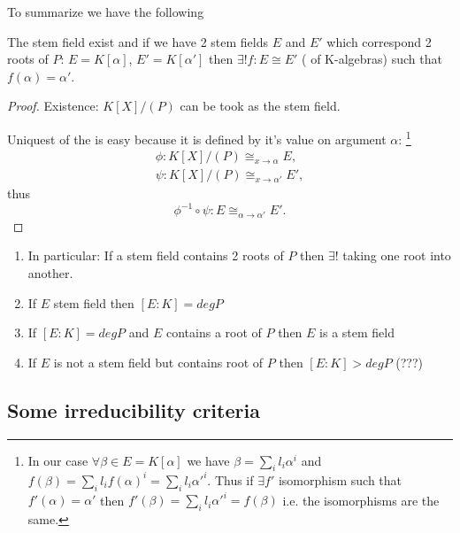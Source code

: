 To summarize we have the following
\begin{proposition}
  The stem field exist and if we have 2 stem fields $E$ and $E'$ which
  correspond 2 roots of $P$: $E = K\left[\alpha\right]$,
  $E' = K\left[\alpha'\right]$ then $\exists! f: E \cong E'$
  ( of K-algebras) such that $f(\alpha) =
  \alpha'$. 
  \begin{proof}
    Existence: $K\left[X\right]/\left(P\right)$ can be took as the
    stem field.

    Uniquest of the  is easy because it is
    defined by it's value on argument $\alpha$:
    \footnote{
      In our case $\forall \beta \in E = K\left[\alpha\right]$ we have
      $\beta = \sum_i l_i \alpha^i$ and
      $f\left( \beta \right) = \sum_i l_i f \left( \alpha\right)^i =
      \sum_i l_i \alpha'^i$.
      Thus if $\exists f'$ isomorphism such that $f'\left(\alpha \right) =
      \alpha'$ then
      $f'\left( \beta \right) = \sum_i l_i \alpha'^i = f \left( \beta
      \right)$ i.e. the isomorphisms are the same.
    }
    \begin{eqnarray}
      \phi: K\left[X\right]/\left(P\right) \cong_{x \to \alpha} E,
      \nonumber \\
      \psi: K\left[X\right]/\left(P\right) \cong_{x \to \alpha'} E',
      \nonumber
    \end{eqnarray}
    thus
    \[
    \phi^{-1} \circ \psi: E \cong_{\alpha \to \alpha'} E'.
    \]
  \end{proof}
  \label{prop:stemfield}
\end{proposition}

\begin{remark}
  \begin{enumerate}
  \item In particular: If a stem field contains 2 roots of $P$ then
    $\exists!$  taking one root into
    another.
  \item If $E$ stem field then $\left[E:K\right] = deg P$
  \item If $\left[E:K\right] = deg P$ and $E$ contains a root of $P$
    then $E$ is a stem field
  \item If $E$ is not a stem field but contains root of $P$ then
    $\left[E:K\right] > deg P$ (???)
  \end{enumerate}
  \label{rem:lec2_1}
\end{remark}

\subsection{Some irreducibility criteria}


